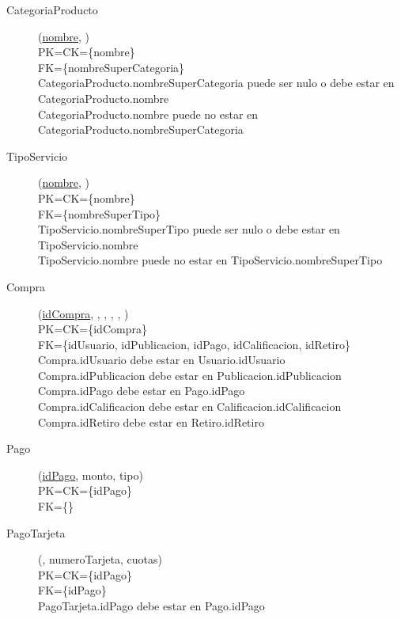 \begin{description}
 \item[CategoriaProducto](\underline{nombre}, )\\
PK=CK=\{nombre\}\\
FK=\{nombreSuperCategoria\}\\
CategoriaProducto.nombreSuperCategoria puede ser nulo o debe estar en CategoriaProducto.nombre\\
CategoriaProducto.nombre puede no estar en CategoriaProducto.nombreSuperCategoria

 \item[TipoServicio](\underline{nombre}, )\\
PK=CK=\{nombre\}\\
FK=\{nombreSuperTipo\}\\
TipoServicio.nombreSuperTipo puede ser nulo o debe estar en TipoServicio.nombre\\
TipoServicio.nombre puede no estar en TipoServicio.nombreSuperTipo


 \item[Compra](\underline{idCompra}, , , , , )\\
PK=CK=\{idCompra\}\\
FK=\{idUsuario, idPublicacion, idPago, idCalificacion, idRetiro\}\\
Compra.idUsuario debe estar en Usuario.idUsuario \\
Compra.idPublicacion debe estar en Publicacion.idPublicacion
Compra.idPago debe estar en Pago.idPago \\
Compra.idCalificacion debe estar en Calificacion.idCalificacion \\
Compra.idRetiro debe estar en Retiro.idRetiro 

 \item[Pago](\underline{idPago}, monto, tipo)\\
PK=CK=\{idPago\}\\
FK=\{\}

 \item[PagoTarjeta](\underline{}, numeroTarjeta, cuotas)\\
PK=CK=\{idPago\}\\
FK=\{idPago\}\\
PagoTarjeta.idPago debe estar en Pago.idPago


\end{description}

